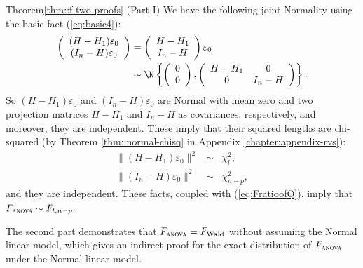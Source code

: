 \begin{myproof}{Theorem}{\ref{thm::f-two-proofs} (Part I)}
We have the following joint Normality using the basic fact
(\ref{eq:basic4}): 
\begin{align*}
\left(\begin{array}{c}
(H-H_{1})\varepsilon_{0}\\
(I_{n}-H)\varepsilon_{0}
\end{array}\right) & =\left(\begin{array}{c}
H-H_{1}\\
I_{n}-H
\end{array}\right)\varepsilon_{0}\\
 & \sim\N\left\{ \left(\begin{array}{c}
0\\
0
\end{array}\right),\left(\begin{array}{cc}
H-H_{1} & 0\\
0 & I_{n}-H
\end{array}\right)\right\} .
\end{align*}
So $(H-H_{1})\varepsilon_{0}$ and $(I_{n}-H)\varepsilon_{0}$ are
Normal with mean zero and two projection matrices $H-H_{1}$ and $I_{n}-H$
as covariances, respectively, and moreover, they are independent.
These imply that their squared lengths are chi-squared (by Theorem \ref{thm::normal-chisq} in Appendix \ref{chapter:appendix-rvs}):
\begin{eqnarray*}
\|(H-H_{1})\varepsilon_{0}\|^{2} &\sim & \chi_{l}^{2},\\
\|(I_{n}-H)\varepsilon_{0}\|^{2} &\sim & \chi_{n-p}^{2},
\end{eqnarray*} 
and they are independent. These facts, coupled with (\ref{eq:FratioofQ}),
imply that $F_\textsc{anova}  \sim F_{l,n-p}.$ 
\end{myproof}


The second part demonstrates that $F_\textsc{anova}  = F_\text{Wald}$ without assuming the Normal linear model, which gives an indirect proof for the exact distribution of $F_\textsc{anova}$ under the Normal linear model. 

